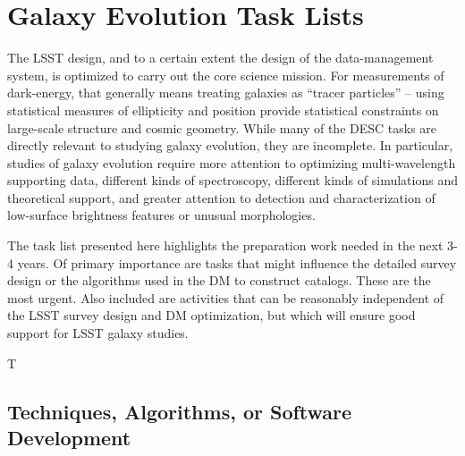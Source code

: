 
\section{Galaxy Evolution Task Lists}\label{sec:tasks:gal:intro}  

The LSST design, and to a certain extent the design of the data-management
system, is optimized to carry out the core science mission. For measurements
of dark-energy, that generally means treating galaxies as ``tracer particles'' --
using statistical measures of ellipticity and position provide statistical
constraints on large-scale structure and cosmic geometry. While many of the
DESC tasks are directly relevant to studying galaxy evolution, they are 
incomplete. In particular, studies of galaxy evolution require more attention to 
optimizing multi-wavelength supporting data, different kinds of spectroscopy, different
kinds of simulations and theoretical support, and greater attention to detection
and characterization of low-surface brightness features or unusual morphologies.

The task list presented here highlights the preparation work needed in the next 3-4
years. Of primary importance are tasks that might influence the detailed survey
design or the algorithms used in the DM to construct catalogs. These are the most
urgent. Also included are activities that can be reasonably independent of the
LSST survey design and DM optimization, but which will ensure good support for
LSST galaxy studies.

\begin{tasklist}{T}
\begin{task}
\label{task:label_for_this_task}
\end{task}
\end{tasklist}  

\subsection{Techniques, Algorithms, or Software Development} \label{sec:tasks:gal:techniques_and_algorithms}

